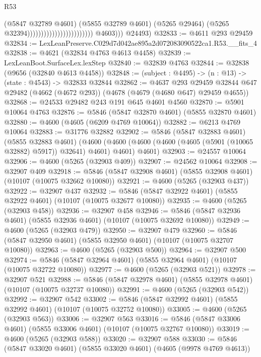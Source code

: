 \begin{lexlean}{R53}
\begin{coremodule}
                                                          (@5847 @32789 @4601)
                                                          (@5855 @32789 @4601)
                                                          (@5265 @29464)
                                                          (@5265 @32394))))))))))))))))))))))))
            @4603)))
      @24493)
@32833 := @4611 @293 @29459
@32834 := LexLeanPreserve.C029d7d042ae895a2d072083090522ca1.R53.__fits_4
@32838 := @4621 (@32834 @4763 @4613 @4458)
@32839 := LexLeanBoot.SurfaceLex.lexStep
@32840 := @32839 @4763
@32844 := @32838 (@9656 (@32840 @4613 @4458))
@32848 := (subject : @4495) -> (n : @13) -> (state : @4543) -> @32833 @32844
@32862 := @4637
    @293
    @29459
    @32844
    @647
    @29482
    (@4662 (@4672 @293))
    (@4678 (@4679 (@4680 @647) @29459 @4655))
@32868 := @24533 @29482 @243 @191 @645 @4601 @4560
@32870 := @5901 @10064 @4763
@32876 := @5846 (@5847 @32870 @4601) (@5855 @32870 @4601)
@32880 := @4600 (@4605 (@6209 @4769 @10064))
@32882 := @6213 @4769 @10064
@32883 := @31776 @32882
@32902 := @5846
    (@5847 @32883 @4601)
    (@5855 @32883 @4601)
    (@4600 (@4600 (@4600 (@4600 (@4605 (@5901 (@10065 @32882) @5917)) @32641) @4601) @4601) @4601)
@32903 := @24557 @10064
@32906 := @4600 (@5265 (@32903 @409))
@32907 := @24562 @10064
@32908 := @32907 @409
@32918 := @5846 (@5847 @32908 @4601) (@5855 @32908 @4601) (@10107 (@10075 @32662 @10080))
@32921 := @4600 (@5265 (@32903 @437))
@32922 := @32907 @437
@32932 := @5846 (@5847 @32922 @4601) (@5855 @32922 @4601) (@10107 (@10075 @32677 @10080))
@32935 := @4600 (@5265 (@32903 @458))
@32936 := @32907 @458
@32946 := @5846 (@5847 @32936 @4601) (@5855 @32936 @4601) (@10107 (@10075 @32692 @10080))
@32949 := @4600 (@5265 (@32903 @479))
@32950 := @32907 @479
@32960 := @5846 (@5847 @32950 @4601) (@5855 @32950 @4601) (@10107 (@10075 @32707 @10080))
@32963 := @4600 (@5265 (@32903 @500))
@32964 := @32907 @500
@32974 := @5846 (@5847 @32964 @4601) (@5855 @32964 @4601) (@10107 (@10075 @32722 @10080))
@32977 := @4600 (@5265 (@32903 @521))
@32978 := @32907 @521
@32988 := @5846 (@5847 @32978 @4601) (@5855 @32978 @4601) (@10107 (@10075 @32737 @10080))
@32991 := @4600 (@5265 (@32903 @542))
@32992 := @32907 @542
@33002 := @5846 (@5847 @32992 @4601) (@5855 @32992 @4601) (@10107 (@10075 @32752 @10080))
@33005 := @4600 (@5265 (@32903 @563))
@33006 := @32907 @563
@33016 := @5846 (@5847 @33006 @4601) (@5855 @33006 @4601) (@10107 (@10075 @32767 @10080))
@33019 := @4600 (@5265 (@32903 @588))
@33020 := @32907 @588
@33030 := @5846 (@5847 @33020 @4601) (@5855 @33020 @4601) (@4605 (@9978 @4769 @4613))

\end{coremodule}
\end{lexlean}
